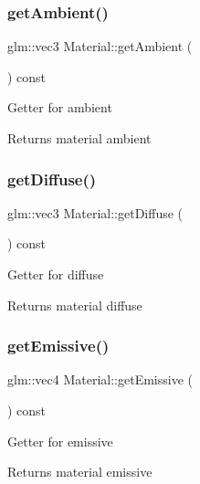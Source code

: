 \subsubsection{\texorpdfstring{get\+Ambient()}{getAmbient()}}
{\footnotesize\ttfamily glm\+::vec3 Material\+::get\+Ambient (\begin{DoxyParamCaption}{ }\end{DoxyParamCaption}) const}

Getter for ambient \begin{DoxyReturn}{Returns}
material ambient 
\end{DoxyReturn}
\mbox{\label{classMaterial_a33a535aa972c0770bf0e9c7a412304c3}} 
\subsubsection{\texorpdfstring{get\+Diffuse()}{getDiffuse()}}
{\footnotesize\ttfamily glm\+::vec3 Material\+::get\+Diffuse (\begin{DoxyParamCaption}{ }\end{DoxyParamCaption}) const}

Getter for diffuse \begin{DoxyReturn}{Returns}
material diffuse 
\end{DoxyReturn}
\mbox{\label{classMaterial_a11b302faa194dbf7689a1371640ef0d5}} 
\subsubsection{\texorpdfstring{get\+Emissive()}{getEmissive()}}
{\footnotesize\ttfamily glm\+::vec4 Material\+::get\+Emissive (\begin{DoxyParamCaption}{ }\end{DoxyParamCaption}) const}

Getter for emissive \begin{DoxyReturn}{Returns}
material emissive 
\end{DoxyReturn}
\mbox{\label{classMaterial_ac65754d70c261b6065087fe3ce828872}} 
